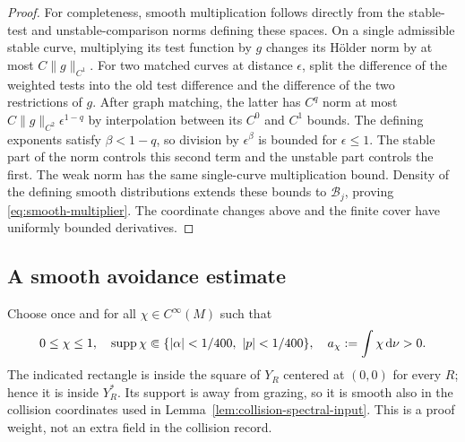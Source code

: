 \begin{proof}
For completeness, smooth multiplication follows directly from the
stable-test and unstable-comparison norms defining these spaces. On a
single admissible stable curve, multiplying its test function by $g$
changes its H\"older norm by at most $C\|g\|_{C^1}$. For two matched
curves at distance $\epsilon$, split the difference of the weighted tests
into the old test difference and the difference of the two restrictions
of $g$. After graph matching, the latter has $C^q$ norm at most
$C\|g\|_{C^2}\epsilon^{1-q}$ by interpolation between its $C^0$ and
$C^1$ bounds. The defining exponents satisfy $\beta<1-q$, so division
by $\epsilon^\beta$ is bounded for $\epsilon\le1$. The stable part of the
norm controls this second term and the unstable part controls the first.
The weak norm has the same single-curve multiplication bound. Density of
the defining smooth distributions extends these bounds to
$\mathcal B_j$, proving \eqref{eq:smooth-multiplier}. The coordinate
changes above and the finite cover have uniformly bounded derivatives.
\end{proof}

\subsection{A smooth avoidance estimate}
Choose once and for all $\chi\in C^\infty(M)$ such that
\begin{equation}\label{eq:fixed-killing-weight}
 0\le\chi\le1,\quad
 \operatorname{supp}\chi\Subset\{ |\alpha|<1/400,\ |p|<1/400\},\quad
 a_\chi:=\int\chi\,\mathrm d\nu>0.
\end{equation}
The indicated rectangle is inside the square of $Y_R$ centered at
$(0,0)$ for every $R$; hence it is inside $Y_R^*$. Its support is away
from grazing, so it is smooth also in the collision coordinates used in
Lemma~\ref{lem:collision-spectral-input}. This is a proof weight, not an
extra field in the collision record.

